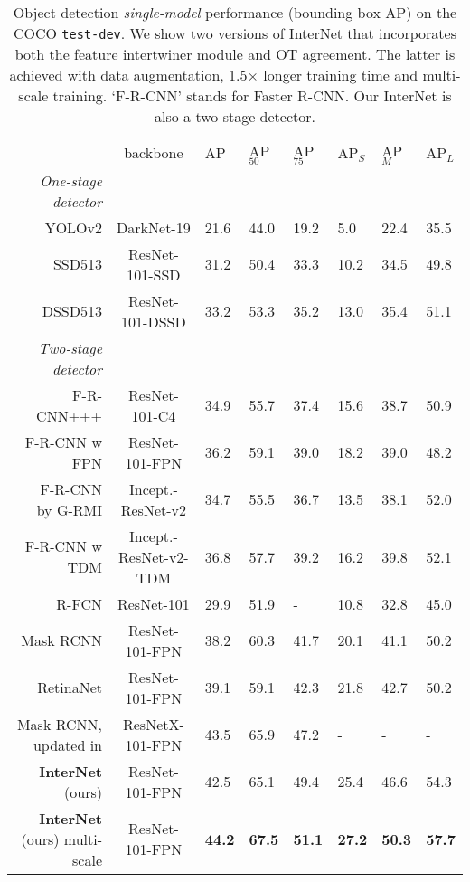 \documentclass{article} \usepackage{iclr2019_conference,times}
\newcommand{\tablestyle}[2]{\setlength{\tabcolsep}{#1}\renewcommand{\arraystretch}{#2}\centering\footnotesize}
\begin{document}
\begin{table*}[h]
	\tablestyle{0.5pt}{1.05}
	\centering
	\begin{tabular}{   r  |c|x{22}x{22}x{22}|x{22}x{22}x{22}}
		& backbone
		& AP & AP$_{50}$ & AP$_{75}$
		& AP$_S$ & AP$_M$ &  AP$_L$\\ [.1em]
		\shline
		\emph{One-stage detector} & & & & & & & \\
		~YOLOv2 \citep{redmon2016_yolo_v2} & DarkNet-19 & 21.6 & 44.0 & 19.2 & 5.0 & 22.4 & 35.5 \\
		~SSD513 \citep{liu2015_ssd} & ResNet-101-SSD & 31.2 & 50.4 & 33.3 & 10.2 & 34.5 & 49.8 \\
		~DSSD513 \citep{fu2017_dssd} & ResNet-101-DSSD & 33.2 & 53.3 & 35.2 & 13.0 & 35.4 & 51.1 \\
		\hline
		\emph{Two-stage detector} & & & & & & & \\
		~F-R-CNN+++ \citep{he2016_resnet} & ResNet-101-C4 & 34.9 & 55.7 & 37.4 & 15.6 & 38.7 & 50.9\\
		~F-R-CNN w FPN \citep{lin2017_FPN} & ResNet-101-FPN
		& 36.2 & 59.1 & 39.0 & 18.2 & 39.0 & 48.2\\
		~F-R-CNN by G-RMI \citep{huang2017_speed_accuracy} & Incept.-ResNet-v2 
& 34.7 & 55.5 & 36.7 & 13.5 & 38.1 & 52.0\\
		~F-R-CNN w TDM \citep{shrivastava2016_top_down_modulation} & Incept.-ResNet-v2-TDM
		& 36.8 & 57.7 & 39.2 & 16.2 & 39.8 & {52.1}\\
		~R-FCN \citep{dai2016_rfcn} & ResNet-101 & 29.9 & 51.9  & - & 10.8 & 32.8 & 45.0 \\
		Mask RCNN \citep{he2017_mask_rcnn} & ResNet-101-FPN & 38.2 & 60.3 & 41.7 & 20.1 & 41.1 & 50.2 \\
		~{RetinaNet} \citep{lin2017_focal_loss} & ResNet-101-FPN & 39.1 & 59.1 & 42.3 & 21.8 & 42.7 & 50.2 \\
	Mask RCNN, updated in \citep{he2017_mask_rcnn}  & ResNetX-101-FPN & 43.5 &  65.9 &  47.2 & - & - & - \\
\hline 
~\textbf{InterNet} (ours) & ResNet-101-FPN & 42.5 & 65.1&  49.4& 25.4 & 46.6 & 54.3 \\
		~\textbf{InterNet} (ours) \scriptsize multi-scale & ResNet-101-FPN &  \textbf{44.2}& \textbf{67.5}&  \textbf{51.1}&  \textbf{27.2}&  \textbf{50.3}& \textbf{57.7} \\
	\end{tabular}
\caption{
		Object detection \textit{single-model} performance (bounding box AP) on the COCO \texttt{test-dev}. 
		We show two versions of InterNet that incorporates both the feature intertwiner module and OT agreement. The latter is achieved with data augmentation, 1.5$\times$ longer training time and multi-scale training.  `F-R-CNN' stands for Faster R-CNN.
Our InterNet is also a two-stage detector.
	}\label{tab:final_compare_complete}
\end{table*}
\end{document}
